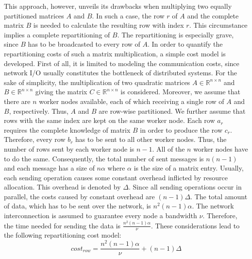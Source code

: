 This approach, however, unveils its drawbacks when multiplying two equally partitioned matrices $A$ and $B$. 
In such a case, the row $r$ of $A$ and the complete matrix $B$ is needed to calculate the resulting row with index $r$. 
This circumstance implies a complete repartitioning of $B$. 
The repartitioning is especially grave, since $B$ has to be broadcasted to every row of $A$. 
In order to quantify the repartitioning costs of such a matrix multiplication, a simple cost model is developed. 
First of all, it is limited to modeling the communication costs, since network I/O usually constitutes the bottleneck of distributed systems. 
For the sake of simplicity, the multiplication of two quadratic matrices $A \in \mathbb{R}^{n\times n}$ and $B \in \mathbb{R}^{n\times n}$ giving the matrix $C\in \mathbb{R}^{n \times n}$ is considered. 
Moreover, we assume that there are $n$ worker nodes available, each of which receiving a single row of $A$ and $B$, respectively. 
Thus, $A$ and $B$ are row-wise partitioned. 
We further assume that rows with the same index are kept on the same worker node. 
Each row $a_r$ requires the complete knowledge of matrix $B$ in order to produce the row $c_r$. 
Therefore, every row $b_r$ has to be sent to all other worker nodes. 
Thus, the number of rows sent by each worker node is $n-1$. 
All of the $n$ worker nodes have to do the same. 
Consequently, the total number of sent messages is $n(n-1)$ and each message has a size of $n\alpha$ where $\alpha$ is the size of a matrix entry. 
Usually, each sending operation causes some constant overhead inflicted by resource allocation. 
This overhead is denoted by $\Delta$. 
Since all sending operations occur in parallel, the costs caused by constant overhead are $(n-1)\Delta$. 
The total amount of data, which has to be sent over the network, is $n^2(n-1)\alpha$. 
The network interconnection is assumed to guarantee every node a bandwidth $\nu$. 
Therefore, the time needed for sending the data is $\frac{n^2(n-1)\alpha}{\nu}$. 
These considerations lead to the following repartitioning cost model:
\small
\begin{displaymath}
	cost_{row} = \frac{n^2(n-1)\alpha}{\nu} + (n-1)\Delta
\end{displaymath}
\normalsize

